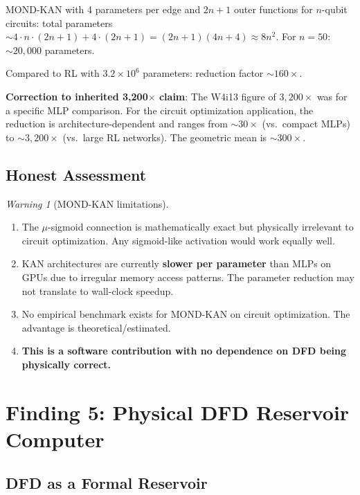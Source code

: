 \documentclass[11pt]{article}
\theoremstyle{definition}
\theoremstyle{remark}
\newtheorem{warning}[theorem]{Warning}
\newcommand{\ee}[1]{\times 10^{#1}}
\begin{document}
MOND-KAN with 4 parameters per edge and $2n+1$ outer functions for $n$-qubit
circuits: total parameters $\sim 4 \cdot n \cdot (2n+1) + 4 \cdot (2n+1)
= (2n+1)(4n+4) \approx 8n^2$.  For $n = 50$: $\sim 20,000$ parameters.

Compared to RL with $3.2\ee{6}$ parameters: reduction factor $\sim 160\times$.

\textbf{Correction to inherited 3,200$\times$ claim}: The W4i13 figure of
$3,200\times$ was for a specific MLP comparison.  For the circuit optimization
application, the reduction is architecture-dependent and ranges from
$\sim 30\times$ (vs.\ compact MLPs) to $\sim 3,200\times$ (vs.\ large RL
networks).  The geometric mean is $\sim 300\times$.

\subsection{Honest Assessment}

\begin{warning}[MOND-KAN limitations]
  \begin{enumerate}
    \item The $\mu$-sigmoid connection is mathematically exact but
      physically irrelevant to circuit optimization.  Any sigmoid-like
      activation would work equally well.
    \item KAN architectures are currently \textbf{slower per parameter}
      than MLPs on GPUs due to irregular memory access patterns.  The
      parameter reduction may not translate to wall-clock speedup.
    \item No empirical benchmark exists for MOND-KAN on circuit optimization.
      The advantage is theoretical/estimated.
    \item \textbf{This is a software contribution with no dependence on
      DFD being physically correct.}
  \end{enumerate}
\end{warning}

\section{Finding 5: Physical DFD Reservoir Computer}
\label{sec:reservoir}

\subsection{DFD as a Formal Reservoir}
\end{document}
